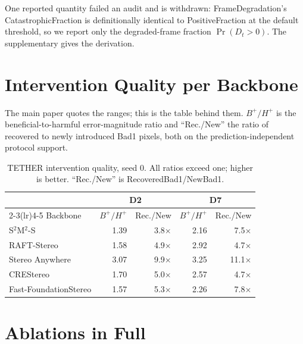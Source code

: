 \documentclass[letterpaper,10pt,conference]{ieeeconf}
\begin{document}
One reported quantity failed an audit and is withdrawn: FrameDegradation's
CatastrophicFraction is definitionally identical to PositiveFraction at
the default threshold, so we report only the degraded-frame fraction
$\Pr(D_t>0)$. The supplementary gives the derivation.

\section{Intervention Quality per Backbone}

The main paper quotes the ranges; this is the table behind them. $B^+/H^+$ is the beneficial-to-harmful error-magnitude ratio and ``Rec./New'' the ratio of recovered to newly introduced Bad1 pixels, both on the prediction-independent protocol support.

\begin{table}[!htb]
\centering
\scriptsize
\caption{
TETHER intervention quality, seed $0$.
All ratios exceed one; higher is better.
``Rec./New'' is RecoveredBad1/NewBad1.
}
\label{tab:intervention_quality}
\begin{tabular}{lrrrr}
\toprule
& \multicolumn{2}{c}{D2} & \multicolumn{2}{c}{D7} \\
\cmidrule(lr){2-3}\cmidrule(lr){4-5}
Backbone & $B^+/H^+$ & Rec./New & $B^+/H^+$ & Rec./New \\
\midrule
S$^2$M$^2$-S          & 1.39 & 3.8$\times$  & 2.16 & 7.5$\times$ \\
RAFT-Stereo           & 1.58 & 4.9$\times$  & 2.92 & 4.7$\times$ \\
Stereo Anywhere       & 3.07 & 9.9$\times$  & 3.25 & 11.1$\times$ \\
CREStereo             & 1.70 & 5.0$\times$  & 2.57 & 4.7$\times$ \\
Fast-FoundationStereo & 1.57 & 5.3$\times$  & 2.26 & 7.8$\times$ \\
\bottomrule
\end{tabular}
\end{table}

\section{Ablations in Full}
\label{sec:ablations_full}
\end{document}
